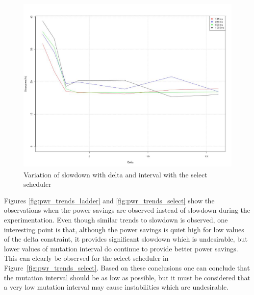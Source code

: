 \begin{figure}[h!]
  \begin{center}
    \includegraphics[height=3.5in]{figures/trends_slowdown_select.jpg}%
    \caption{Variation of slowdown with delta and interval with the select scheduler}
    \label{fig:slowdown_trends_select}
  \end{center}
\end{figure}

Figures \ref{fig:pwr_trends_ladder} and \ref{fig:pwr_trends_select} show the observations 
when the power savings are observed instead of slowdown during the experimentation. 
Even though similar trends to slowdown is observed, one interesting point is that, although
the power savings is quiet high for low values of the delta constraint, it provides 
significant slowdown which is undesirable, but lower values of mutation interval do continue
to provide better power savings. This can clearly be observed for the select scheduler in
Figure~\ref{fig:pwr_trends_select}. Based on these conclusions one can conclude that 
the mutation interval should be as low as possible, but it must be considered that a very
low mutation interval may cause instabilities which are undesirable.

